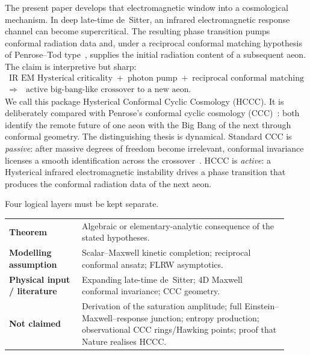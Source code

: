 \documentclass[11pt]{article}
\theoremstyle{definition}
\theoremstyle{remark}
\begin{document}
The present paper develops that electromagnetic window into a cosmological mechanism.
In deep late-time de~Sitter, an infrared electromagnetic response channel can become
supercritical.
The resulting phase transition pumps conformal radiation data and, under a reciprocal
conformal matching hypothesis of Penrose--Tod type~\cite{Penrose2006,Penrose2010,Tod2003},
supplies the initial radiation content of a subsequent aeon.
The claim is interpretive but sharp:
\begin{equation}
\label{eq:claim}
\boxed{\begin{gathered}
\text{IR EM Hysterical criticality}
\;+\;
\text{photon pump}
\;+\;
\text{reciprocal conformal matching}\\
\Longrightarrow\quad
\text{active big-bang-like crossover to a new aeon.}
\end{gathered}}
\end{equation}
We call this package Hysterical Conformal Cyclic Cosmology (HCCC).
It is deliberately compared with Penrose's conformal cyclic cosmology
(CCC)~\cite{Penrose2006,Penrose2010,Penrose2013CCC}: both identify the remote future of one
aeon with the Big Bang of the next through conformal geometry.
The distinguishing thesis is dynamical.
Standard CCC is \emph{passive}: after massive degrees of freedom become irrelevant, conformal
invariance licenses a smooth identification across the crossover~\cite{Penrose2010,Tod2003}.
HCCC is \emph{active}: a Hysterical infrared electromagnetic instability drives a phase
transition that produces the conformal radiation data of the next aeon.

Four logical layers must be kept separate.
\begin{center}
\begin{tabular}{@{}>{\bfseries}p{0.24\linewidth}p{0.68\linewidth}@{}}
\toprule
Theorem & Algebraic or elementary-analytic consequence of the stated hypotheses.\\
Modelling assumption & Scalar--Maxwell kinetic completion; reciprocal conformal ansatz; FLRW asymptotics.\\
Physical input / literature & Expanding late-time de~Sitter; 4D Maxwell conformal invariance; CCC geometry.\\
Not claimed & Derivation of the saturation amplitude; full Einstein--Maxwell--response junction;
entropy production; observational CCC rings/Hawking points; proof that Nature realises HCCC.\\
\bottomrule
\end{tabular}
\end{center}
\end{document}
